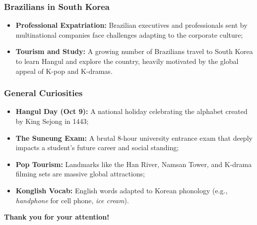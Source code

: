 \documentclass{beamer}
\begin{document}
\begin{frame}
    \frametitle{Brazilians in South Korea}
    \begin{itemize}
        \item \textbf{Professional Expatriation:} Brazilian executives and professionals sent by multinational companies face challenges adapting to the corporate culture;
        \item \textbf{Tourism and Study:} A growing number of Brazilians travel to South Korea to learn Hangul and explore the country, heavily motivated by the global appeal of K-pop and K-dramas.
    \end{itemize}
\end{frame}

\begin{frame}
    \frametitle{General Curiosities}
    \begin{itemize}
        \item \textbf{Hangul Day (Oct 9):} A national holiday celebrating the alphabet created by King Sejong in 1443;
        \item \textbf{The Suneung Exam:} A brutal 8-hour university entrance exam that deeply impacts a student's future career and social standing;
        \item \textbf{Pop Tourism:} Landmarks like the Han River, Namsan Tower, and K-drama filming sets are massive global attractions;
        \item \textbf{Konglish Vocab:} English words adapted to Korean phonology (e.g., \textit{handphone} for cell phone, \textit{ice cream}).
    \end{itemize}

\end{frame}
\begin{frame}
    \centering
    \Huge \textbf{Thank you for your attention!}
\end{frame}
\end{document}
